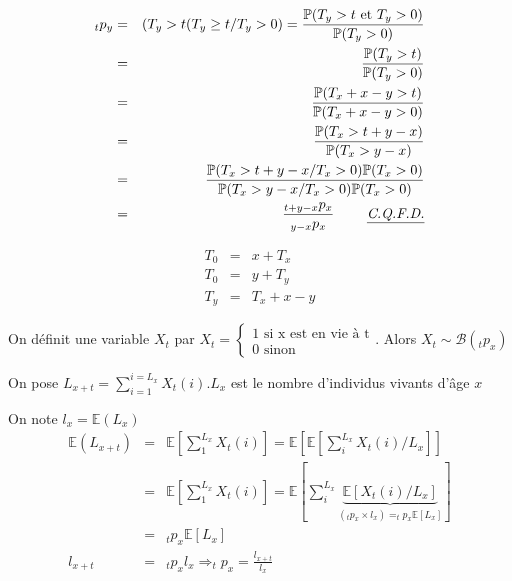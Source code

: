 \documentclass{report}
\newcommand{\E}{\mathbb{E}}
\begin{document}
\begin{minipage}{0.65\textwidth}%
\begin{eqnarray}
_tp_y&=&(T_y>t(T_y\geq t/T_y>0)=\displaystyle\frac{\mathbb{P}(T_y>t\mbox{ et }T_y>0)}{\mathbb{P}(T_y>0)}\nonumber\\
&=&\displaystyle\frac{\mathbb{P}(T_y>t)}{\mathbb{P}(T_y>0)}\nonumber\\
&=&\displaystyle\frac{\mathbb{P}(T_x+x-y>t)}{\mathbb{P}(T_x+x-y>0)}\nonumber\\
&=&\displaystyle\frac{\mathbb{P}(T_x>t+y-x)}{\mathbb{P}(T_x>y-x)}\nonumber\\
&=&\displaystyle\frac{\mathbb{P}(T_x>t+y-x/T_x>0)\mathbb{P}(T_x>0)}{\mathbb{P}(T_x>y-x/T_x>0)\mathbb{P}(T_x>0)}\nonumber\\
&=&\displaystyle\frac{_{t+y-x}p_x}{_{y-x}p_x}\ \ \ \ \ \ \ \mbox{\underline{\textit{C.Q.F.D.}}}\nonumber
\end{eqnarray}
\end{minipage}%
\hfill
\begin{minipage}{0.35\textwidth}%
\vspace{0.2cm}
\begin{eqnarray}
T_0&=&x+T_x\nonumber\\
T_0&=&y+T_y\nonumber\\
T_y&=&T_x+x-y\nonumber
\end{eqnarray}\end{minipage}

On définit une variable $X_t$ par $X_t=\left\{\begin{array}{l}
\mbox{1 si x est en vie à t}\\
\mbox{0 sinon}
\end{array}\right.$. Alors $X_t\sim \mathcal{B}(_tp_x)$

On pose $ L_{x+t} = \displaystyle\sum_{i=1}^{i=L_x}X_t(i)$.$L_x$ est le nombre d'individus vivants d'âge $x$

On note $l_x=\E(L_x)$
\begin{eqnarray}
\E(L_{x+t})&=&\E\left[\displaystyle\sum_1^{L_x}X_t(i)\right]=\E\left[\E\left[\displaystyle\sum_i^{L_x}X_t(i)/L_x\right]\right]\nonumber\\
&=&\E\left[\displaystyle\sum_1^{L_x}X_t(i)\right]=\E\left[\displaystyle\sum_i^{L_x}\underbrace{\E\left[X_t(i)/L_x\right]}_{(_tp_x\times l_x)=_tp_x\E[L_x]}\right]\nonumber\\
&=&_tp_x\E[L_x]\nonumber\\
l_{x+t}&=&_tp_xl_x\Rightarrow _tp_x =  \displaystyle\frac{l_{x+t}}{l_x}\nonumber
\end{eqnarray}
\end{document}
